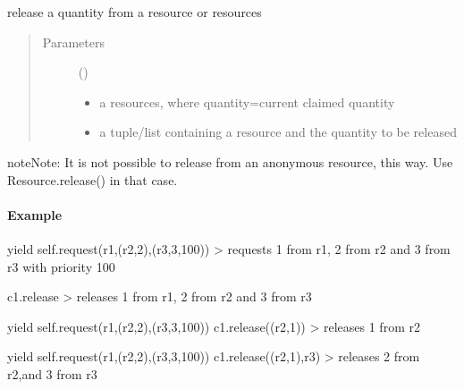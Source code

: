 \documentclass[letterpaper,10pt,english]{sphinxmanual}
\begin{document}
\begin{fulllineitems}
\begin{fulllineitems}
\end{fulllineitems}


\begin{fulllineitems}
\label{\detokenize{Reference:salabim.Component.release}}
release a quantity from a resource or resources
\begin{quote}\begin{description}
\item[{Parameters}] \leavevmode
{} (\sphinxstyleliteralemphasis{\sphinxupquote{, }}) \textendash{} \begin{itemize}
\item {} 
a resources, where quantity=current claimed quantity

\item {} 
a tuple/list containing a resource and the quantity to be released

\end{itemize}


\end{description}\end{quote}

\begin{sphinxadmonition}{note}{Note:}
It is not possible to release from an anonymous resource, this way.
Use Resource.release() in that case.
\end{sphinxadmonition}
\paragraph{Example}

yield self.request(r1,(r2,2),(r3,3,100)) 
\textendash{}\textgreater{} requests 1 from r1, 2 from r2 and 3 from r3 with priority 100 

c1.release 
\textendash{}\textgreater{} releases 1 from r1, 2 from r2 and 3 from r3 

yield self.request(r1,(r2,2),(r3,3,100)) 
c1.release((r2,1)) 
\textendash{}\textgreater{} releases 1 from r2 

yield self.request(r1,(r2,2),(r3,3,100)) 
c1.release((r2,1),r3) 
\textendash{}\textgreater{} releases 2 from r2,and 3 from r3

\end{fulllineitems}


\end{fulllineitems}
\end{document}

